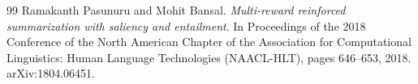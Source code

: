 \begin{thebibliography}{99}
Ramakanth Pasunuru and Mohit Bansal.
\textit{Multi-reward reinforced summarization with saliency and entailment}.
In Proceedings of the 2018 Conference of the North American Chapter of the Association for Computational Linguistics: Human Language Technologies (NAACL-HLT), pages 646--653, 2018.
arXiv:1804.06451.

\end{thebibliography}
